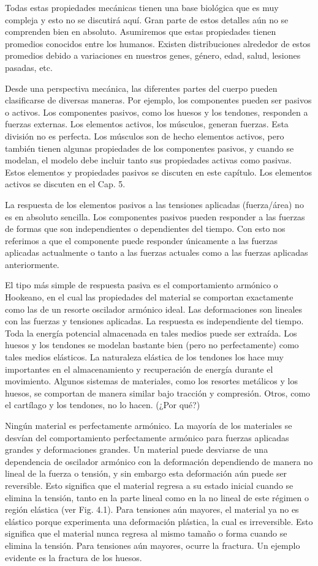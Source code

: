 \documentclass[12pt]{book}
\begin{document}
Todas estas propiedades mecánicas tienen una base biológica que es muy compleja y esto no se discutirá aquí. Gran parte de estos detalles aún no se comprenden bien en absoluto. Asumiremos que estas propiedades tienen promedios conocidos entre los humanos. Existen distribuciones alrededor de estos promedios debido a variaciones en nuestros genes, género, edad, salud, lesiones pasadas, etc.

Desde una perspectiva mecánica, las diferentes partes del cuerpo pueden clasificarse de diversas maneras. Por ejemplo, los componentes pueden ser pasivos o activos. Los componentes pasivos, como los huesos y los tendones, responden a fuerzas externas. Los elementos activos, los músculos, generan fuerzas. Esta división no es perfecta. Los músculos son de hecho elementos activos, pero también tienen algunas propiedades de los componentes pasivos, y cuando se modelan, el modelo debe incluir tanto sus propiedades activas como pasivas. Estos elementos y propiedades pasivos se discuten en este capítulo. Los elementos activos se discuten en el Cap. 5.

La respuesta de los elementos pasivos a las tensiones aplicadas (fuerza/área) no es en absoluto sencilla. Los componentes pasivos pueden responder a las fuerzas de formas que son independientes o dependientes del tiempo. Con esto nos referimos a que el componente puede responder únicamente a las fuerzas aplicadas actualmente o tanto a las fuerzas actuales como a las fuerzas aplicadas anteriormente.

El tipo más simple de respuesta pasiva es el comportamiento armónico o Hookeano, en el cual las propiedades del material se comportan exactamente como las de un resorte oscilador armónico ideal. Las deformaciones son lineales con las fuerzas y tensiones aplicadas. La respuesta es independiente del tiempo. Toda la energía potencial almacenada en tales medios puede ser extraída. Los huesos y los tendones se modelan bastante bien (pero no perfectamente) como tales medios elásticos. La naturaleza elástica de los tendones los hace muy importantes en el almacenamiento y recuperación de energía durante el movimiento. Algunos sistemas de materiales, como los resortes metálicos y los huesos, se comportan de manera similar bajo tracción y compresión. Otros, como el cartílago y los tendones, no lo hacen. (¿Por qué?)

Ningún material es perfectamente armónico. La mayoría de los materiales se desvían del comportamiento perfectamente armónico para fuerzas aplicadas grandes y deformaciones grandes. Un material puede desviarse de una dependencia de oscilador armónico con la deformación dependiendo de manera no lineal de la fuerza o tensión, y sin embargo esta deformación aún puede ser reversible. Esto significa que el material regresa a su estado inicial cuando se elimina la tensión, tanto en la parte lineal como en la no lineal de este régimen o región elástica (ver Fig. 4.1). Para tensiones aún mayores, el material ya no es elástico porque experimenta una deformación plástica, la cual es irreversible. Esto significa que el material nunca regresa al mismo tamaño o forma cuando se elimina la tensión. Para tensiones aún mayores, ocurre la fractura. Un ejemplo evidente es la fractura de los huesos.
\end{document}
